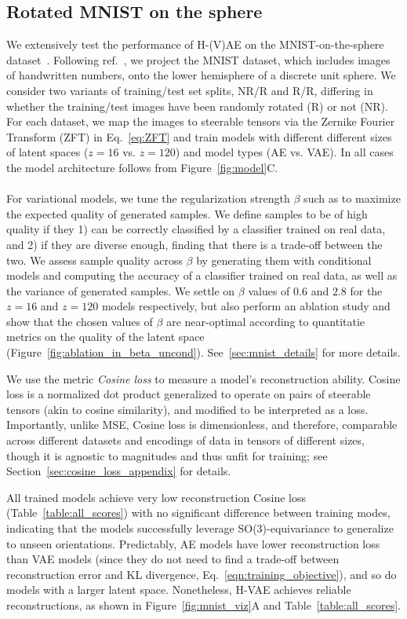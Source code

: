 \subsection{Rotated MNIST on the sphere}
\label{sec:mnist_results}
We extensively test the performance of  H-(V)AE on the MNIST-on-the-sphere
dataset~\cite{deng_mnist_2012}. Following ref.~\cite{cohen_spherical_2018}, we project the MNIST
dataset, which includes images of handwritten numbers,  onto the lower hemisphere of a discrete
unit sphere.
We consider two variants of training/test set splits, NR/R and R/R, differing in whether the
training/test images have been randomly rotated (R) or not (NR). For each dataset, we map the
images to steerable tensors via the Zernike Fourier Transform (ZFT) in Eq.~\ref{eq:ZFT} and train
models with different different sizes of latent spaces ($z=16$ vs. $z=120$) and model
types (AE vs. VAE). In all cases the model architecture follows from Figure~\ref{fig:model}C.\\
\\
For variational models, we tune the regularization strength $\beta$ such as to maximize
the expected quality of generated samples. We define samples to be of high quality if they 1) can
be correctly classified by a classifier trained on real data, and 2) if they are diverse enough,
finding that there is a trade-off between the two. We assess sample quality across $\beta$ by
generating them with conditional models and computing the accuracy of a classifier trained on real
data, as well as the variance of generated samples. We settle on $\beta$ values of $0.6$ and $2.8$
for the $z=16$ and $z=120$ models respectively, but also perform an ablation study and show that
the chosen values of $\beta$ are near-optimal according to quantitatie metrics on the quality of
the latent space (Figure~\ref{fig:ablation_in_beta_uncond}). See~\ref{sec:mnist_details} for more
details.


We use the metric {\em Cosine loss} to measure a model's reconstruction ability. Cosine loss is a
normalized dot product generalized to operate on pairs of steerable tensors (akin to cosine
similarity), and modified to be interpreted as a loss. Importantly, unlike MSE, Cosine loss is
dimensionless, and therefore, comparable across different datasets and encodings of data in tensors
of different sizes, though it is agnostic to magnitudes and thus unfit for training; see
Section~\ref{sec:cosine_loss_appendix} for details.

All trained models achieve very low reconstruction Cosine loss (Table~\ref{table:all_scores}) with
no significant difference between training modes, indicating that the models successfully leverage
SO(3)-equivariance to generalize to unseen orientations. Predictably, AE models have lower
reconstruction loss than VAE models (since they do not need to find a trade-off between
reconstruction error and KL divergence, Eq.~\ref{eqn:training_objective}), and so do models with a
larger latent space. Nonetheless, H-VAE achieves reliable reconstructions, as shown in
Figure~\ref{fig:mnist_viz}A and Table~\ref{table:all_scores}.


